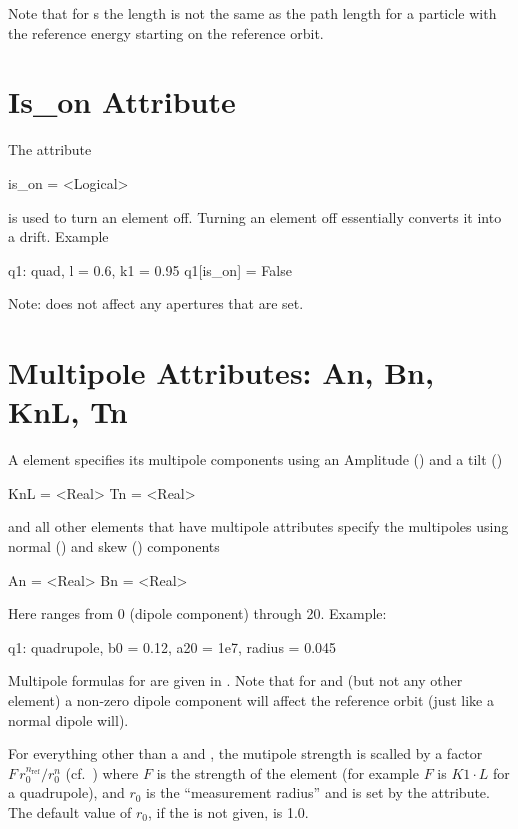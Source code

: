 Note that for s
the length  is not the same as the path length for a particle
with the reference energy starting on the reference orbit.

\section{Is_on Attribute}
\label{s:is_on}

The  attribute
\begin{example}
  is_on = <Logical>
\end{example}
is used to turn an element off. Turning
an element off essentially converts it into a drift.
Example
\begin{example}
  q1: quad, l = 0.6, k1 = 0.95
  q1[is_on] = False
\end{example}
Note:  does not affect any apertures that are set.

\section{Multipole Attributes: An, Bn, KnL, Tn}
\label{s:multip}

A  element specifies its multipole components using an
Amplitude () and a tilt ()
\begin{example}
  KnL = <Real>
  Tn  = <Real>
\end{example}
 and all other elements that
have multipole attributes specify the multipoles using normal
() and skew () components 
\begin{example}
  An = <Real>
  Bn = <Real>
\end{example}
Here  ranges from 0
(dipole component) through 20. Example:
\begin{example}
  q1: quadrupole, b0 = 0.12, a20 = 1e7, radius = 0.045
\end{example}

Multipole formulas for are given in .  Note that for
 and  (but not any other element) a
non-zero dipole component will affect the reference orbit (just like a
normal dipole will).

For everything other than a  and , the
mutipole strength is scalled by a factor $F \, r_0^{n_\text{ref}} /
r_0^n$ (cf.~) where $F$ is the strength of the element (for
example $F$ is $K1 \cdot L$ for a quadrupole), and $r_0$ is the
``measurement radius'' and is set by the  attribute. The
default value of $r_0$, if the  is not given, is 1.0.
